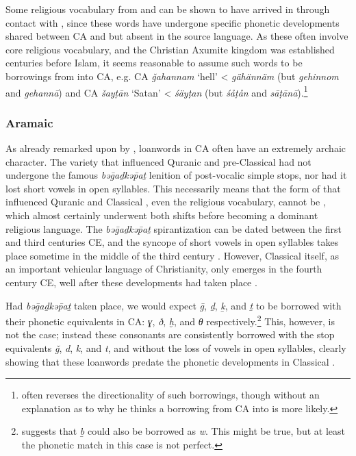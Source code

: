 \documentclass[output=paper]{langsci/langscibook}
\begin{document}
Some religious vocabulary from  and  can be shown to have arrived in  through contact with , since these words have undergone specific phonetic developments shared between CA and  but absent in the {source language}. As these often involve core religious vocabulary, and the Christian Axumite kingdom was established centuries before Islam, it seems reasonable to assume such words to be borrowings from  into CA, e.g. CA \textit{ǧahannam} ‘hell’ <  \textit{gähännäm} (but  \textit{gehinnom} and  \textit{gehannā}) and CA \textit{šayṭān} ‘Satan’ <  \textit{śäyṭan} (but  \textit{śåṭån} and  \textit{sāṭānā}).\footnote{\citet{Leslau1990} often reverses the directionality of such borrowings, though without an explanation as to why he thinks a borrowing from CA into  is more likely.}

\subsubsection{\label{bkm:Ref13224460}Aramaic}

As already remarked upon by \citet{Retsö2011},  {loanwords} in CA often have an extremely archaic character. The  variety that influenced Quranic and pre-Classical  had not undergone the famous \textit{bəḡaḏkəp̄aṯ} lenition of post-vocalic simple stops, nor had it lost short vowels in open syllables. This necessarily means that the form of  that influenced Quranic and Classical , even the religious vocabulary, cannot be , which almost certainly underwent both shifts before becoming a dominant religious language. The \textit{bəḡaḏkəp̄aṯ} spirantization can be dated between the first and third centuries CE, and the syncope of short vowels in open syllables takes place sometime in the middle of the third century \citep[41--42]{Gzella2015}. However, Classical  itself, as an important vehicular language of Christianity, only emerges in the fourth century CE, well after these developments had taken place \citep[259]{Gzella2015}.

Had \textit{bəḡaḏkəp̄aṯ} taken place, we would expect  \textit{ḡ}, \textit{ḏ}, \textit{ḵ}, and \textit{ṯ} to be borrowed with their phonetic equivalents in CA: \textit{ɣ}, \textit{ð}, \textit{ḫ}, and \textit{θ} respectively.\footnote{\cite{Retsö2011} suggests that \textit{ḇ} could also be borrowed as \textit{w}. This might be true, but at least the phonetic match in this case is not perfect.} This, however, is not the case; instead these consonants are consistently borrowed with the stop equivalents \textit{ǧ}, \textit{d}, \textit{k}, and \textit{t}, and without the loss of vowels in open syllables, clearly showing that these  {loanwords} predate the phonetic developments in Classical .
\end{document}
